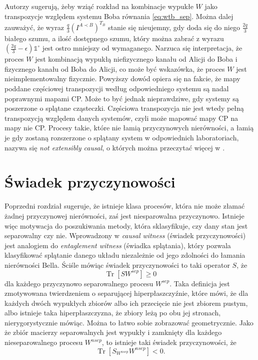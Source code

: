 \documentclass[10pt]{article} %
\DeclareMathOperator{\Trs}{Tr}
\newcommand{\IO}{\mathbb{1}^\circ}
\begin{document}
Autorzy \cite{causal_mode} sugerują, żeby wziąć rozkład na kombinacje wypukłe $W$ jako transpozycje względem systemu Boba równania \eqref{eq:wtb_sep}. Można dalej zauważyć, że wyraz $\frac{q}{3} \left( I^{A \prec B} \right)^{T_B}$ stanie się nieujemny, gdy doda się do niego $\frac{2q}{3}$ białego szumu,
a ilość dostępnego szumu, który można zabrać z wyrazu $\left( \frac{2q}{3} - \epsilon \right) \IO$ jest ostro mniejszy od wymaganego. Narzuca się interpretacja, że proces $W$ jest kombinacją wypukłą niefizycznego kanału od Alicji do Boba i fizycznego kanału od Boba do Alicji, co może być wskazówka, że proces
$W$ jest nieimplementowalny fizycznie.
Powyższy dowód opiera się na fakcie, że mapy poddane częściowej transpozycji według odpowiedniego systemu są nadal poprawnymi mapami CP.
Może to być jednak nieprawdziwe, gdy systemy są poszerzone o splątane cząsteczki. Częściowa transpozycja nie jest wtedy pełną transpozycją względem danych systemów, czyli może mapować mapy CP na mapy nie CP. Procesy takie, które nie łamią przyczynowych nierówności, a łamią je gdy zostaną rozszerzone o splątany system w odpowiednich laboratoriach, nazywa się \textit{not extensibly causal},
o których można przeczytać więcej w \cite{causal_model}.
\section{Świadek przyczynowości} 
Poprzedni rozdział sugeruje, że istnieje klasa procesów, która nie może złamać żadnej przyczynowej nierówności, zaś jest niesparowalna przyczynowo. Istnieje więc motywacja do poszukiwania metody, która sklasyfikuje, czy dany stan jest separowalny czy nie. Wprowadzony w \cite{causal_witness} \textit{causal witness}
(świadek przyczynowości) jest analogiem do \textit{entaglement witness} (świadka splątania), który pozwala klasyfikować splątanie danego układu niezależnie od jego zdolności do łamania nierówności Bella. Ściśle mówiąc świadek przyczynowości to taki operator $S$, że
\begin{equation}
\label{eq:witness_gez}
\Trs\left[S W^{sep} \right]\geq 0
\end{equation}
dla każdego przyczynowo separowalnego procesu $W^{sep}$. Taka definicja jest zmotywowana twierdzeniem o separującej hiperpłaszczyźnie, które mówi, że dla każdych dwóch wypukłych zbiorów albo ich przecięcie nie jest zbiorem pustym, albo istnieje taka hiperpłaszczyzna, że zbiory leżą po obu jej stronach, nierygorystycznie mówiąc. Można to łatwo sobie zobrazować geometrycznie. Jako że zbiór macierzy separowalnych jest wypukły i zamknięty dla każdego nieseparowalnego procesu $W^{nsep}$, to istnieje taki świadek przyczynowości, że 
\begin{equation}
\Trs \left[ S_{W^{nsep}} W^{nsep} \right] < 0.
\end{equation}
\end{document}
